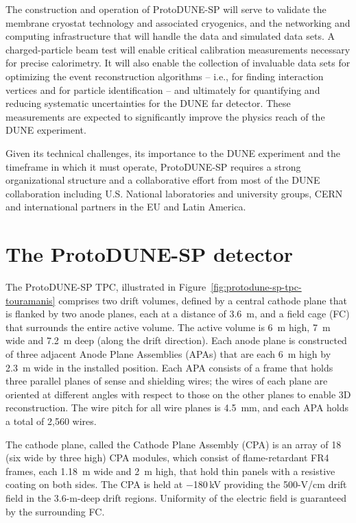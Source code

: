 The construction and operation of ProtoDUNE-SP will serve to validate the membrane cryostat technology and associated cryogenics, and the networking and computing infrastructure that will handle the data and simulated data sets.
A charged-particle beam test will enable critical calibration measurements necessary for precise calorimetry. It will also enable the collection of invaluable data sets for optimizing the event reconstruction algorithms -- i.e., for finding interaction vertices and for particle identification -- and ultimately for quantifying and reducing systematic uncertainties for the DUNE far detector. These measurements are expected to significantly improve the physics reach of the DUNE experiment.

Given its technical challenges, its importance to the DUNE experiment and the timeframe in which it must operate, ProtoDUNE-SP requires
  a strong organizational structure and a collaborative effort from most of the DUNE collaboration including U.S. National laboratories and university groups, CERN and international partners in the EU and Latin America. 


\section{The ProtoDUNE-SP detector}
\label{intro:detector}

The ProtoDUNE-SP TPC, illustrated in Figure~\ref{fig:protodune-sp-tpc-touramanis} comprises two drift volumes, defined by  a central cathode plane that is flanked by two anode planes, each at a distance of 3.6~m, and a field cage (FC) that surrounds the entire active volume. The active volume is 6~m high, 7~m wide and 7.2~m deep (along the drift direction).
Each anode plane is constructed of three adjacent Anode Plane Assemblies (APAs) that are each 6~m high by 2.3~m wide in the installed position. Each APA consists of a frame that holds three parallel planes of sense and shielding wires; the wires of each plane are
oriented at different angles with respect to those on the other planes to enable 3D reconstruction.  The wire pitch for all wire planes is 4.5~mm, and each APA holds a total of 2,560 wires. 

The cathode plane, called the Cathode Plane Assembly (CPA) is an array of 18 (six wide by three high) CPA modules, which consist of  flame-retardant FR4 frames, each 1.18~m wide and 2~m high, that hold thin panels with a resistive coating on both sides. 
The CPA is held at $-$180\,kV providing the 500-V/cm drift field in the 3.6-m-deep drift regions. 
Uniformity of the electric field is guaranteed by the surrounding FC.
 
